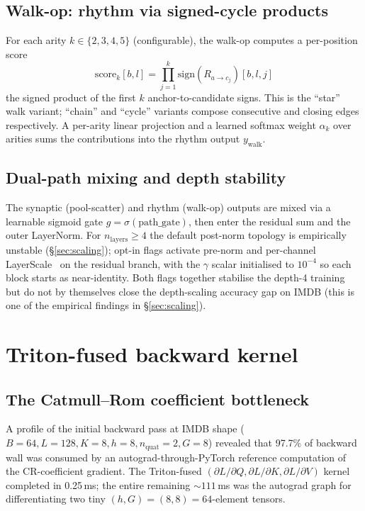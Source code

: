 \documentclass[11pt, a4paper]{article}
\begin{document}
\subsection{Walk-op: rhythm via signed-cycle products}

For each arity $k \in \{2, 3, 4, 5\}$ (configurable), the walk-op
computes a per-position score
\begin{equation}
\mathrm{score}_k[b, l] = \prod_{j=1}^{k} \mathrm{sign}(R_{a \to c_j})[b, l, j]
\end{equation}
the signed product of the first $k$ anchor-to-candidate signs. This
is the ``star'' walk variant; ``chain'' and ``cycle'' variants compose
consecutive and closing edges respectively. A per-arity linear projection
and a learned softmax weight $\alpha_k$ over arities sums the
contributions into the rhythm output $y_{\text{walk}}$.

\subsection{Dual-path mixing and depth stability}

The synaptic (pool-scatter) and rhythm (walk-op) outputs are mixed via
a learnable sigmoid gate $g = \sigma(\mathrm{path\_gate})$, then enter
the residual sum and the outer LayerNorm. For $n_{\text{layers}} \geq 4$
the default post-norm topology is empirically unstable
(\S\ref{sec:scaling}); opt-in flags activate pre-norm and per-channel
LayerScale~\cite{touvron2021going} on the residual branch, with the
$\gamma$ scalar initialised to $10^{-4}$ so each block starts as
near-identity. Both flags together stabilise the depth-4 training but
do not by themselves close the depth-scaling accuracy gap on IMDB
(this is one of the empirical findings in \S\ref{sec:scaling}).

\section{Triton-fused backward kernel}
\label{sec:opt}

\subsection{The Catmull--Rom coefficient bottleneck}

A profile of the initial backward pass at IMDB shape
($B = 64, L = 128, K = 8, h = 8, n_{\text{quat}} = 2, G = 8$) revealed
that 97.7\% of backward wall was consumed by an autograd-through-PyTorch
reference computation of the CR-coefficient gradient. The
Triton-fused $(\partial L/\partial Q, \partial L/\partial K,
\partial L/\partial V)$ kernel completed in 0.25\,ms; the entire
remaining $\sim 111\,$ms was the autograd graph for differentiating two
tiny $(h, G) = (8, 8) = 64$-element tensors.
\end{document}
